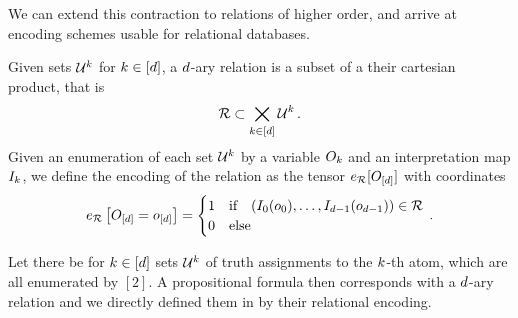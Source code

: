 %




We can extend this contraction to relations of higher order, and arrive at encoding schemes usable for relational databases.

\begin{definition}\label{def:daryRelation}
	Given sets $\mathcal{U}^{k}$ for $k\in[d]$, a $d$-ary relation is a subset of a their cartesian product, that is
	\begin{align*}
		\mathcal{R} \subset\bigtimes_{k\in[d]} \mathcal{U}^{k} \, .
	\end{align*}
	Given an enumeration of each set $\mathcal{U}^{k}$ by a variable $O_{k}$ and an interpretation map $I_{k}$, we define the encoding of the relation as the tensor $e_{\mathcal{R}}[O_{[d]}]$ with coordinates
	\begin{align*}
		e_{\mathcal{R}}\left[O_{[d]}=o_{[d]}\right]
		= \begin{cases}
		1 & \text{if} \quad (I_{0}(o_{0}),\ldots,I_{d-1}(o_{d-1})) \in \mathcal{R} \\
		0 & \text{else}
		\end{cases} \, .
	\end{align*}
\end{definition}

	Let there be for $k\in[d]$ sets $\mathcal{U}^{k}$ of truth assignments to the $k$-th atom, which are all enumerated by $[2]$.
	A propositional formula then corresponds with a $d$-ary relation and we directly defined them in  by their relational encoding.

